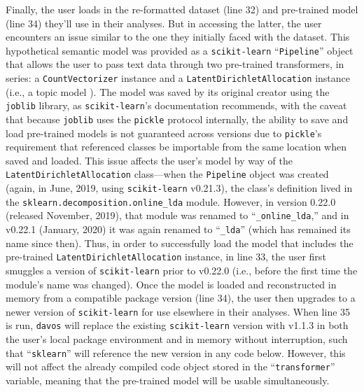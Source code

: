 \documentclass[preprint,12pt,a4paper]{elsarticle}
\begin{document}
Finally, the user loads in the re-formatted dataset (line 32) and pre-trained model (line 34) they'll use in their analyses. But in accessing the latter, the user encounters an issue similar to the one they initially faced with the dataset. This hypothetical semantic model was provided as a \texttt{scikit-learn} ``\texttt{Pipeline}'' object that allows the user to pass text data through two pre-trained transformers, in series: a \texttt{CountVectorizer} instance and a \texttt{LatentDirichletAllocation} instance (i.e., a topic model \cite{BleiEtal03}). The model was saved by its original creator using the \texttt{joblib} library, as \texttt{scikit-learn}'s documentation recommends, with the caveat that because \texttt{joblib} uses the \texttt{pickle} protocol internally, the ability to save and load pre-trained models is not guaranteed across versions due to \texttt{pickle}'s requirement that referenced classes be importable from the same location when saved and loaded. This issue affects the user's model by way of the \texttt{LatentDirichletAllocation} class---when the \texttt{Pipeline} object was created (again, in June, 2019, using \texttt{scikit-learn} v0.21.3), the class's definition lived in the \texttt{sklearn.decomposition.online\_lda} module. However, in version 0.22.0 (released November, 2019), that module was renamed to ``\texttt{\_online\_lda},'' and in v0.22.1 (January, 2020) it was again renamed to ``\texttt{\_lda}'' (which has remained its name since then). Thus, in order to successfully load the model that includes the pre-trained \texttt{LatentDirichletAllocation} instance, in line 33, the user first smuggles a version of \texttt{scikit-learn} prior to v0.22.0 (i.e., before the first time the module's name was changed). Once the model is loaded and reconstructed in memory  from a compatible package version (line 34), the user then upgrades to a newer version of \texttt{scikit-learn} for use elsewhere in their analyses. When 
line 35 is run, \texttt{davos} will replace the existing \texttt{scikit-learn} version with v1.1.3 in both the user's local package environment and in memory without interruption, such that ``\texttt{sklearn}'' will reference the new version in any code below. However, this will not affect the already compiled code object stored in the ``\texttt{transformer}'' variable, meaning that the pre-trained model will be usable simultaneously. 
\end{document}
